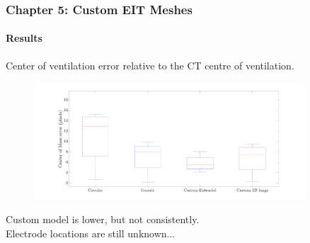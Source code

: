 \documentclass[10pt,    %
    english,            %
    xcolor=table,       %
    envcountsect,        %
    aspectratio=1610
]{beamer}
\begin{document}
\begin{frame}
	\frametitle{Chapter 5: Custom EIT Meshes}
	\framesubtitle{Results}   
	Center of ventilation error relative to the CT centre of ventilation.
	\\ \vspace{2mm}
	\begin{figure}[H]
		\centering
		\includegraphics[width=0.9\textwidth,trim={0 1.5cm 0 1.5cm},clip]{error_boxplot.pdf}
	\end{figure}%
	\vspace{1mm}
	Custom model is lower, but not consistently. 
	\\ \vspace{5mm}
	\centering
	\alert{Electrode locations are still unknown...}
\end{frame}
\end{document}
